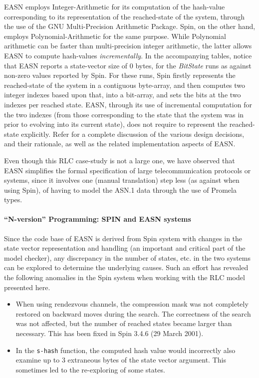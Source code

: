 \documentclass{entcs} \usepackage{entcsmacro}
\begin{document}
EASN employs Integer-Arithmetic for its computation of the hash-value
corresponding to its representation of the reached-state of the
system, through the use of the GNU Multi-Precision Arithmetic Package.
Spin, on the other hand, employs Polynomial-Arithmetic for the same
purpose. While Polynomial arithmetic can be faster than
multi-precision integer arithmetic, the latter allows EASN to compute
hash-values \emph{incrementally}. In the accompanying tables, notice
that EASN reports a state-vector size of 0 bytes, for the
\emph{BitState} runs as against non-zero values reported by Spin. For
these runs, Spin firstly represents the reached-state of the system in
a contiguous byte-array, and then computes two integer indexes based
upon that, into a bit-array, and sets the bits at the two indexes per
reached state. EASN, through its use of incremental computation for
the two indexes (from those corresponding to the state that the system
was in prior to evolving into its current state), does not require to
represent the reached-state explicitly. Refer \cite{easnspin} for a
complete discussion of the various design decisions, and their
rationale, as well as the related implementation aspects of EASN.

Even though this RLC case-study is not a large one, we have observed
that EASN simplifies the formal specification of large
telecommunication protocols or systems, since it involves one (manual
translation) step less (as against when using Spin), of having to
model the ASN.1 data through the use of Promela types.

\paragraph{``N-version'' Programming: SPIN and EASN systems}
Since the code base of EASN is derived from Spin system with changes
in the state vector representation and handling (an important and
critical part of the model checker), any discrepancy in the number of
states, etc. in the two systems can be explored to determine the
underlying causes. Such an effort has revealed the following anomalies
in the Spin system when working with the RLC model presented here.
\begin{itemize}
\item When using rendezvous channels, the compression mask was
  not completely restored on backward moves during the search.
  The correctness of the search was not affected, but the
  number of reached states became larger than necessary. This has been
  fixed in Spin 3.4.6 (29 March 2001).

\item In the {\tt s-hash} function, the computed hash value would
incorrectly also examine up to 3 extraneous bytes of the state vector
argument. This sometimes led to the re-exploring of some states.
\end{itemize}
\end{document}
